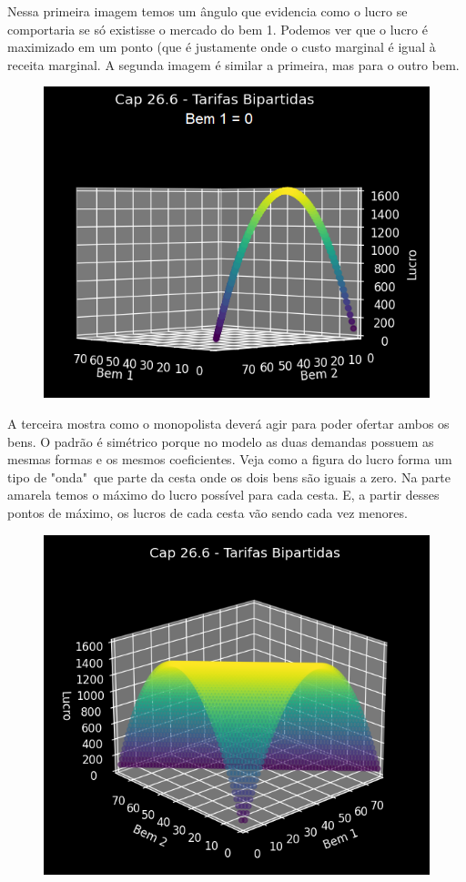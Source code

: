\documentclass[a4paper,11pt,oneside]{book}
\theoremstyle{definition}
\theoremstyle{break}
\begin{document}
Nessa primeira imagem temos um ângulo que evidencia como o lucro se comportaria se só existisse o mercado do bem 1. Podemos ver que o lucro é maximizado em um ponto (que é justamente onde o custo marginal é igual à receita marginal. A segunda imagem é similar a primeira, mas para o outro bem.

\begin{figure}[H]
\centering
\includegraphics[scale=0.6]{cap26_6-tarifas_bipartidas2.png}
\end{figure}

A terceira mostra como o monopolista deverá agir para poder ofertar ambos os bens. O padrão é simétrico porque no modelo as duas demandas possuem as mesmas formas e os mesmos coeficientes. Veja como a figura do lucro forma um tipo de "onda"\ que parte da cesta onde os dois bens são iguais a zero. Na parte amarela temos o máximo do lucro possível para cada cesta. E, a partir desses pontos de máximo, os lucros de cada cesta vão sendo cada vez menores.

\begin{figure}[H]
\centering
\includegraphics[scale=0.8]{cap26_6-tarifas_bipartidas3.png}
\end{figure}
\end{document}

